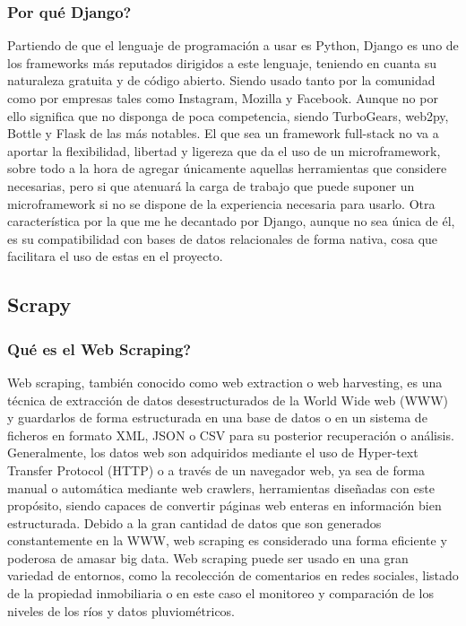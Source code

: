 \subsubsection{Por qué Django?}
Partiendo de que el lenguaje de programación a usar es Python, Django es uno de los frameworks más reputados dirigidos a este lenguaje, teniendo en cuanta su naturaleza gratuita y de código abierto. Siendo usado tanto por la comunidad como por empresas tales como Instagram, Mozilla y Facebook. Aunque no por ello significa que no disponga de poca competencia, siendo TurboGears, web2py, Bottle y Flask de las más notables.
\newline
\newline
El que sea un framework full-stack no va a aportar la flexibilidad, libertad y ligereza que da el uso de un microframework, sobre todo a la hora de agregar únicamente aquellas herramientas que considere necesarias, pero si que atenuará la carga de trabajo que puede suponer un microframework si no se dispone de la experiencia necesaria para usarlo.
\newline
\newline
Otra característica por la que me he decantado por Django, aunque no sea única de él, es su compatibilidad con bases de datos relacionales de forma nativa, cosa que facilitara el uso de estas en el proyecto.

\newpage

\subsection{Scrapy}

\subsubsection{Qué es el Web Scraping?}
Web scraping, también conocido como web extraction o web harvesting, es una técnica de extracción de datos desestructurados de la World Wide web (WWW) y guardarlos de forma estructurada en una base de datos o en un sistema de ficheros en formato XML, JSON o CSV para su posterior recuperación o análisis. Generalmente, los datos web son adquiridos mediante el uso de Hyper-text Transfer Protocol (HTTP) o a través de un navegador web, ya sea de forma manual o automática mediante web crawlers, herramientas diseñadas con este propósito, siendo capaces de convertir páginas web enteras en información bien estructurada. \cite{zhao2017web} \cite{krotov2018legality}
\newline
\newline
Debido a la gran cantidad de datos que son generados constantemente en la WWW, web scraping es considerado una forma eficiente y poderosa de amasar big data.
\newline
\newline
Web scraping puede ser usado en una gran variedad de entornos, como la recolección de comentarios en redes sociales, listado de la propiedad inmobiliaria o en este caso el monitoreo y comparación de los niveles de los ríos y datos pluviométricos.

